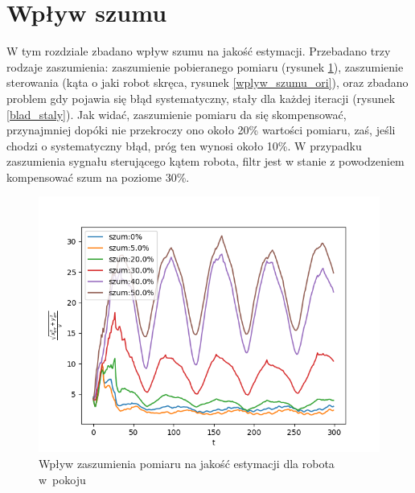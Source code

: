 \section{Wpływ szumu} \label{noise_chapter}
W tym rozdziale zbadano wpływ szumu na jakość estymacji. Przebadano trzy rodzaje zaszumienia: zaszumienie pobieranego pomiaru (rysunek \ref{wplyw_szumu}), zaszumienie sterowania (kąta o jaki robot skręca, rysunek \ref{wplyw_szumu_ori}), oraz zbadano problem gdy pojawia się błąd systematyczny, stały dla każdej iteracji (rysunek \ref{blad_staly}). Jak widać, zaszumienie pomiaru da się skompensować, przynajmniej dopóki nie przekroczy ono około 20\% wartości pomiaru, zaś, jeśli chodzi o systematyczny błąd, próg ten wynosi około 10\%. W przypadku zaszumienia sygnału sterującego kątem robota, filtr jest w stanie z powodzeniem kompensować szum na poziome 30\%.
\begin{figure}[H]
	\begin{center}
		\includegraphics[width=12cm]{./wplyw_szumu.png}
		\caption{Wpływ zaszumienia pomiaru na jakość estymacji dla robota w~pokoju}
		\label{wplyw_szumu}
	\end{center}
\end{figure}

